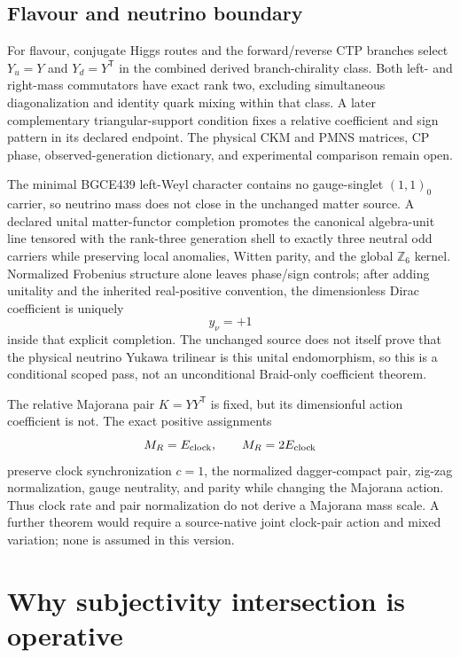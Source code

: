 \documentclass[11pt]{article}
\theoremstyle{definition}
\theoremstyle{remark}
\begin{document}
\subsection{Flavour and neutrino boundary}

For flavour, conjugate Higgs routes and the forward/reverse CTP branches select $Y_u=Y$ and $Y_d=Y^{\mathsf T}$ in the combined derived branch-chirality class. Both left- and right-mass commutators have exact rank two, excluding simultaneous diagonalization and identity quark mixing within that class. A later complementary triangular-support condition fixes a relative coefficient and sign pattern in its declared endpoint. The physical CKM and PMNS matrices, CP phase, observed-generation dictionary, and experimental comparison remain open.

The minimal BGCE439 left-Weyl character contains no gauge-singlet $(1,1)_0$ carrier, so neutrino mass does not close in the unchanged matter source. A declared unital matter-functor completion promotes the canonical algebra-unit line tensored with the rank-three generation shell to exactly three neutral odd carriers while preserving local anomalies, Witten parity, and the global $\mathbb Z_6$ kernel. Normalized Frobenius structure alone leaves phase/sign controls; after adding unitality and the inherited real-positive convention, the dimensionless Dirac coefficient is uniquely
\begin{equation}
 y_\nu=+1
\end{equation}
inside that explicit completion. The unchanged source does not itself prove that the physical neutrino Yukawa trilinear is this unital endomorphism, so this is a conditional scoped pass, not an unconditional Braid-only coefficient theorem.

The relative Majorana pair $K=YY^{\mathsf T}$ is fixed, but its dimensionful action coefficient is not. The exact positive assignments
\begin{equation}
 M_R=E_{\rm clock},
 \qquad
 M_R=2E_{\rm clock}
\end{equation}
preserve clock synchronization $c=1$, the normalized dagger-compact pair, zig-zag normalization, gauge neutrality, and parity while changing the Majorana action. Thus clock rate and pair normalization do not derive a Majorana mass scale. A further theorem would require a source-native joint clock-pair action and mixed variation; none is assumed in this version.

\section{Why subjectivity intersection is operative}
\end{document}
